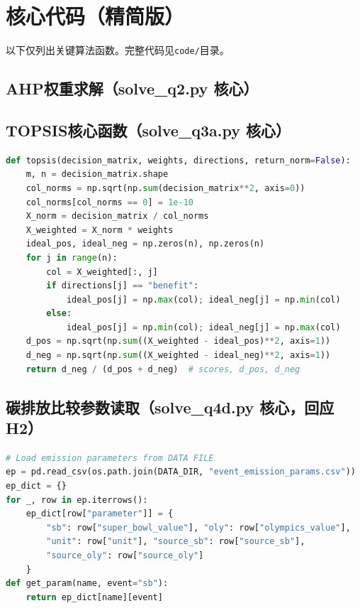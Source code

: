 \documentclass[12pt]{ctexart}
\begin{document}
\section{核心代码（精简版）}

以下仅列出关键算法函数。完整代码见\texttt{code/}目录。

\subsection{AHP权重求解（solve\_q2.py 核心）}


\subsection{TOPSIS核心函数（solve\_q3a.py 核心）}

\vspace{-0.5em}
\begin{lstlisting}[language=Python,caption={TOPSIS实现+温度适宜度修正},firstnumber=90]
def topsis(decision_matrix, weights, directions, return_norm=False):
    m, n = decision_matrix.shape
    col_norms = np.sqrt(np.sum(decision_matrix**2, axis=0))
    col_norms[col_norms == 0] = 1e-10
    X_norm = decision_matrix / col_norms
    X_weighted = X_norm * weights
    ideal_pos, ideal_neg = np.zeros(n), np.zeros(n)
    for j in range(n):
        col = X_weighted[:, j]
        if directions[j] == "benefit":
            ideal_pos[j] = np.max(col); ideal_neg[j] = np.min(col)
        else:
            ideal_pos[j] = np.min(col); ideal_neg[j] = np.max(col)
    d_pos = np.sqrt(np.sum((X_weighted - ideal_pos)**2, axis=1))
    d_neg = np.sqrt(np.sum((X_weighted - ideal_neg)**2, axis=1))
    return d_neg / (d_pos + d_neg)  # scores, d_pos, d_neg
\end{lstlisting}

\subsection{碳排放比较参数读取（solve\_q4d.py 核心，回应H2）}
\begin{lstlisting}[language=Python,caption={从数据文件读取排放参数},firstline=39,lastline=60]
# Load emission parameters from DATA FILE
ep = pd.read_csv(os.path.join(DATA_DIR, "event_emission_params.csv"))
ep_dict = {}
for _, row in ep.iterrows():
    ep_dict[row["parameter"]] = {
        "sb": row["super_bowl_value"], "oly": row["olympics_value"],
        "unit": row["unit"], "source_sb": row["source_sb"],
        "source_oly": row["source_oly"]
    }
def get_param(name, event="sb"):
    return ep_dict[name][event]
\end{lstlisting}
\end{document}
